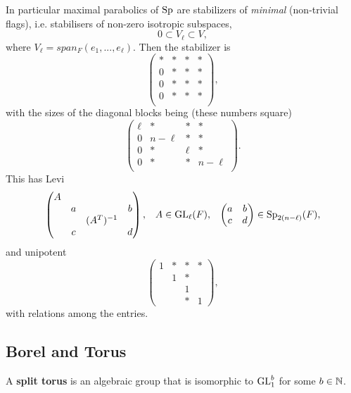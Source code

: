 \vspace{5mm}
    \label{maximal_parabolic}
    In particular maximal parabolics of \(\operatorname{Sp}\) are stabilizers of \textit{minimal} (non-trivial flags), i.e. stabilisers of non-zero isotropic subspaces,
    \[0 \subset V_\ell \subset V,\]
    where \(V_\ell = span_F(e_1, ..., e_\ell)\). Then the stabilizer is 
    \[\begin{pmatrix}
        * &*&*&* \\
        0 &*&*&* \\
        0 &*&*&* \\
        0 &*&*&* \\
    \end{pmatrix},\]
    with the sizes of the diagonal blocks being (these numbers square)
    \[\begin{pmatrix}
        \ell &*&*&* \\
        0 &n-\ell&*&* \\
        0 &*&\ell&* \\
        0 &*&*&n-\ell \\
    \end{pmatrix}.\]
    This has Levi
    \[\begin{pmatrix}
        A &&& \\
         &a&&b \\
         &&(A^T)^{-1}& \\
         &c&&d \\
    \end{pmatrix}, \;\;\; A\in \operatorname{GL}_\ell(F), \;\;\; \begin{pmatrix}
        a & b\\
        c & d \\
    \end{pmatrix} \in \operatorname{Sp}_{2(n-\ell)}(F),\]
    and unipotent 
    \[\begin{pmatrix}
        1 &*&*&* \\
        & 1&*& \\
        && 1& \\
        &&*&1
    \end{pmatrix},\]
    with relations among the entries.

    \subsection{Borel and Torus}\label{borel_torus}    
    A \textbf{split torus} is an algebraic group that is isomorphic to \(\operatorname{GL}_1^b\) for some \(b\in\N\).

